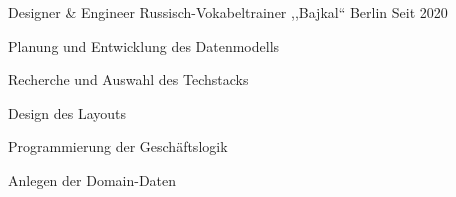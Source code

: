 
\begin{cventries}

  \cventry
  {Designer \& Engineer} %
  {Russisch-Vokabeltrainer ,,Bajkal``} %
  {Berlin} %
  {Seit 2020} %
  {
    \begin{cvitems} %
    \item {Planung und Entwicklung des Datenmodells}
    \item {Recherche und Auswahl des Techstacks}
    \item {Design des Layouts}
    \item {Programmierung der Geschäftslogik}
    \item {Anlegen der Domain-Daten}
    \end{cvitems}
  }

\end{cventries}
